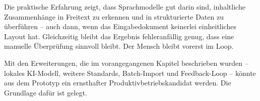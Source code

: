 Die praktische Erfahrung zeigt, dass Sprachmodelle gut darin sind, inhaltliche
Zusammenhänge in Freitext zu erkennen und in strukturierte Daten zu überführen --
auch dann, wenn das Eingabedokument keinerlei einheitliches Layout hat.
Gleichzeitig bleibt das Ergebnis fehleranfällig genug, dass eine manuelle
Überprüfung sinnvoll bleibt. Der Mensch bleibt vorerst im Loop.

Mit den Erweiterungen, die im vorangegangenen Kapitel beschrieben wurden --
lokales KI-Modell, weitere Standards, Batch-Import und Feedback-Loop --
könnte aus dem Prototyp ein ernsthafter Produktivbetriebskandidat werden.
Die Grundlage dafür ist gelegt.
